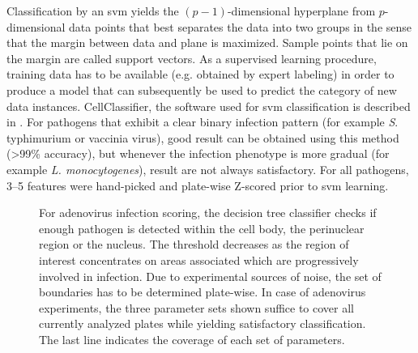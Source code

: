Classification by an \gls{svm} yields the $(p-1)$-dimensional hyperplane from $p$-dimensional data points that best separates the data into two groups in the sense that the margin between data and plane is maximized. Sample points that lie on the margin are called support vectors. As a supervised learning procedure, training data has to be available (e.g. obtained by expert labeling) in order to produce a model that can subsequently be used to predict the category of new data instances. CellClassifier, the software used for \gls{svm} classification is described in \cite{Ramo2009}. For pathogens that exhibit a clear binary infection pattern (for example \textit{S}. typhimurium or vaccinia virus), good result can be obtained using this method (\textgreater 99\% accuracy), but whenever the infection phenotype is more gradual (for example \textit{L. monocytogenes}), result are not always satisfactory. For all pathogens, 3--5 features were hand-picked and plate-wise Z-scored prior to \gls{svm} learning.


\renewcommand{\arraystretch}{1.5}
\setlength{\tabcolsep}{0.5em}
\begin{figure}
  \centering

  \vspace{5mm}
  \footnotesize
  

  \vspace{5mm}
  \caption[Decision tree for adenovirus infection scoring.]{For adenovirus infection scoring, the decision tree classifier checks if enough pathogen is detected within the cell body, the perinuclear region or the nucleus. The threshold decreases as the region of interest concentrates on areas associated which are progressively involved in infection. Due to experimental sources of noise, the set of boundaries has to be determined plate-wise. In case of adenovirus experiments, the three parameter sets shown suffice to cover all currently analyzed plates while yielding satisfactory classification. The last line indicates the coverage of each set of parameters.}
  \label{fig:dectree-adeno}
\end{figure}

